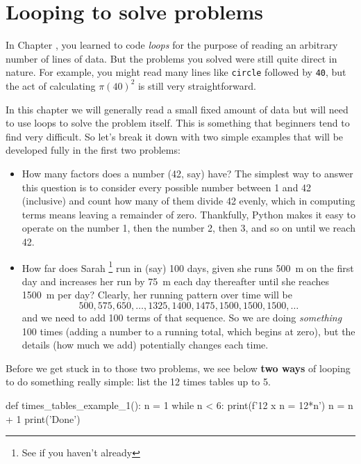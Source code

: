 
\chapter{Looping to solve problems}

In Chapter , you learned to code \emph{loops} for the
purpose of reading an arbitrary number of lines of data. But the problems you solved were
still quite direct in nature. For example, you might read many lines like \texttt{circle}
followed by \texttt{40}, but the act of calculating $\pi(40)^2$ is still very
straightforward.

In this chapter we will generally read a small fixed amount of data but will need to use
loops to solve the problem itself. This is something that beginners tend to find very
difficult. So let's break it down with two simple examples that will be developed fully in
the first two problems:
\begin{itemize}
  \item How many factors does a number (42, say) have? The simplest way to answer this
    question is to consider every possible number between 1 and 42 (inclusive) and count
    how many of them divide 42 evenly, which in computing terms means leaving a remainder
    of zero. Thankfully, Python makes it easy to operate on the number 1, then the number
    2, then 3, and so on until we reach 42.
  \item How far does Sarah%
    \footnote{See  if you haven't already}
    run in (say) 100 days, given she runs \SI{500}{\m} on the first day and
    increases her run by \SI{75}{\m} each day thereafter until she reaches \SI{1500}{\m}
    per day? Clearly, her running pattern over time will be \[
      500, 575, 650, \ldots, 1325, 1400, 1475, 1500, 1500, 1500, \ldots
    \] and we need to add 100 terms of that sequence. So we are doing \emph{something} 100
    times (adding a number to a running total, which begins at zero), but the details (how
    much we add) potentially changes each time.
\end{itemize}

Before we get stuck in to those two problems, we see below \textbf{two ways} of looping to
do something really simple: list the 12 times tables up to 5.

\begin{pythoncode}
  def times_tables_example_1():
    n = 1
    while n < 6:
      print(f'12 x {n} = {12*n}')
      n = n + 1
    print('Done')
\end{pythoncode}

